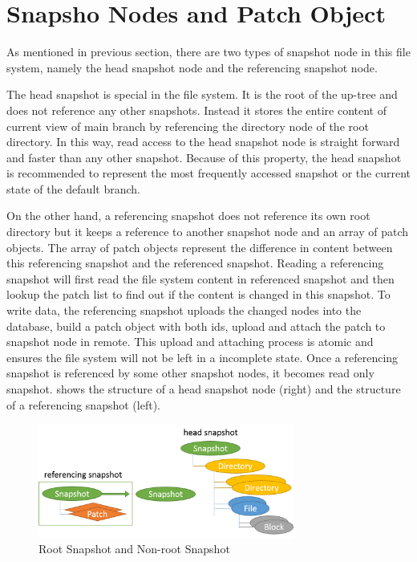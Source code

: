 \section{Snapsho Nodes and Patch Object}

    As mentioned in previous section, there are two types of snapshot node in this file system, namely the head snapshot node and the referencing snapshot node.

    The head snapshot is special in the file system. It is the root of the up-tree and does not reference any other snapshots. Instead it stores the entire content of current view of main branch by referencing the directory node of the root directory. In this way, read access to the head snapshot node is straight forward and faster than any other snapshot. Because of this property, the head snapshot is recommended to represent the most frequently accessed snapshot or the current state of the default branch.

    On the other hand, a referencing snapshot does not reference its own root directory but it keeps a reference to another snapshot node and an array of patch objects. The array of patch objects represent the difference in content between this referencing snapshot and the referenced snapshot. Reading a referencing snapshot will first read the file system content in referenced snapshot and then lookup the patch list to find out if the content is changed in this snapshot. To write data, the referencing snapshot uploads the changed nodes into the database, build a patch object with both ids, upload and attach the patch to snapshot node in remote. This upload and attaching process is atomic and ensures the file system will not be left in a incomplete state. Once a referencing snapshot is referenced by some other snapshot nodes, it becomes read only snapshot.  shows the structure of a head snapshot node (right) and the structure of a referencing snapshot (left).
    
\begin{figure}[hbtp]
\centering
\includegraphics[width=0.75\textwidth]{Chapter-4/figs/fig12.png}
\caption{Root Snapshot and Non-root Snapshot}
\label{fig:root_and_nonroot}
\end{figure}

